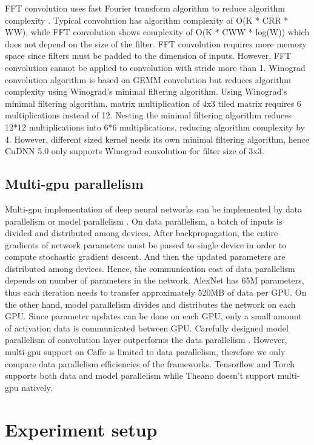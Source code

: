 \documentclass[conference]{IEEEtran}
\begin{document}
FFT convolution uses fast Fourier transform algorithm to reduce algorithm complexity \cite{fftconv}.
Typical convolution has algorithm complexity of O(K * CRR * WW), while FFT convolution shows complexity of O(K * CWW * log(W)) which does not depend on the size of the filter.
FFT convolution requires more memory space since filters must be padded to the dimension of inputs.
However, FFT convolution cannot be applied to convolution with stride more than 1.
Winograd convolution algorithm is based on GEMM convolution but reduces algorithm complexity using Winograd's minimal filtering algorithm.
Using Winograd’s minimal filtering algorithm, matrix multiplication of 4x3 tiled matrix requires 6 multiplications instead of 12.
Nesting the minimal filtering algorithm reduces 12*12 multiplications into 6*6 multiplications, reducing algorithm complexity by 4\cite{winograd}.
However, different sized kernel needs its own minimal filtering algorithm, hence CuDNN 5.0 only supports Winograd convolution for filter size of 3x3.

\subsection{Multi-gpu parallelism}
Multi-gpu implementation of deep neural networks can be implemented by data parallelism or model parallelism \cite{NIPS2012_4687}.
On data parallelism, a batch of inputs is divided and distributed among devices.
After backpropagation, the entire gradients of network parameters must be passed to single device in order to compute stochastic gradient descent.
And then the updated parameters are distributed among devices.
Hence, the communication cost of data parallelism depends on number of parameters in the network.
AlexNet has 65M parameters, thus each iteration needs to transfer approximately 520MB of data per GPU.
On the other hand, model parallelism divides and distributes the network on each GPU.
Since parameter updates can be done on each GPU, only a small amount of activation data is communicated between GPU.
Carefully designed model parallelism of convolution layer outperforms the data parallelism \cite{DBLP:journals/corr/YadanATR13}.
However, multi-gpu support on Caffe is limited to data parallelism, therefore we only compare data parallelism efficiencies of the frameworks.
Tensorflow and Torch supports both data and model parallelism while Theano doesn’t support multi-gpu natively.

\section{Experiment setup}
\end{document}

